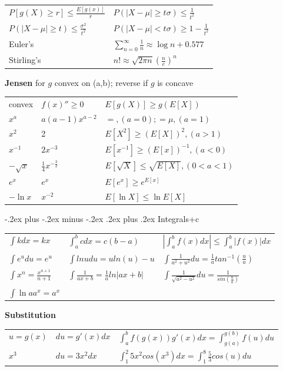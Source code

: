 \documentclass[10pt,landscape]{article}
\makeatletter
\renewcommand{\subsubsection}{\@startsection{subsubsection}{3}{0mm}%
                                {-.2ex plus -.2ex minus -.2ex}%
                                {.2ex plus .2ex}%
                                {\normalfont\small\bfseries}}
\makeatother
\begin{document}
\begin{multicols}{3}
\begin{tabular}{ l|l }
$P[g(X)\ge r] \le \frac{E[g(x)]}{r}$ & $P(|X - \mu| \ge t\sigma) \le \frac{1}{t^2}$ \\
$P(|X - \mu| \ge t) \le \frac{\sigma^2}{t^2}$ & $P(|X - \mu| < t\sigma) \ge 1-\frac{1}{t^2}$ \\
\hline
Euler's     & $\sum_{n=0}^{\infty}\frac{1}{n} \approx \log n + 0.577$ \\
Stirling's  & $n! \approx \sqrt{2\pi n}\left(\frac{n}{e}\right)^n$
\end{tabular}


\textbf{Jensen}  for $g$ convex on (a,b); reverse if $g$ is concave
\begin{tabular}{ l|l|l }
convex & $f(x)''\ge 0$ & $E[g(X)] \ge g(E[X])$ \\
$x^a$  & $a(a-1)x^{a-2}$ & $=,(a=0);=\mu,(a=1)$ \\
$x^2$  & 2 & $E[X^2] \ge (E[X])^2, (a>1)$\\
$x^{-1}$  & $2x^{-3}$ & $E[x^{-1}] \ge (E[x])^{-1}, (a<0)$ \\
$-\sqrt x$ & $\frac14{x^{-\frac{3}{2}}}$ & $E[\sqrt X] \le \sqrt{E[X]},(0<a<1)$ \\
$e^{x}$  & $e^{x}$ & $E[e^{x}] \ge e^{E[x]}$ \\
$-\ln x$ & $x^{-2}$ & $E[\ln X] \le \ln{E[X]}$  \\
\end{tabular}

\subsubsection{Integrals+c}

\begin{tabular}{ l|l|l }
$\int{k}dx=kx$ & $\int_a^b{c}dx=c(b-a)$   & $|\int_a^b{f(x)}dx|\le \int_a^b|{f(x)}|dx$ \\
$\int{e^u}du=e^u$ & $\int{lnu}du=uln(u)-u$& $\int\frac1{a^2+u^2}du=\frac1{a}tan^{-1}(\frac{u}a)$ \\
$\int{x^n}=\frac{x^{n+1}}{n+1}$ & $\int\frac1{ax+b}=\frac{1}aln|ax+b|$ & $\int\frac1{\sqrt{a^2-u^2}}du=\frac1{sin(\frac{u}a)}$ \\
$\int{\ln{a}a^x}=a^x$ &
\end{tabular}

\textbf{Substitution}
\begin{tabular}{ l|l|l }
$u=g(x)$ & $du=g'(x)dx$ & $\int_a^b{f(g(x))}g'(x)dx=\int_{g(a)}^{g(b)}{f(u)}du $ \\
$x^3$    & $du=3x^2dx$  & $\int_1^2{5x^2}cos(x^3)dx=\int_1^8\frac53{cos(u)}du $ \\
\end{tabular}


\end{multicols}
\end{document}
